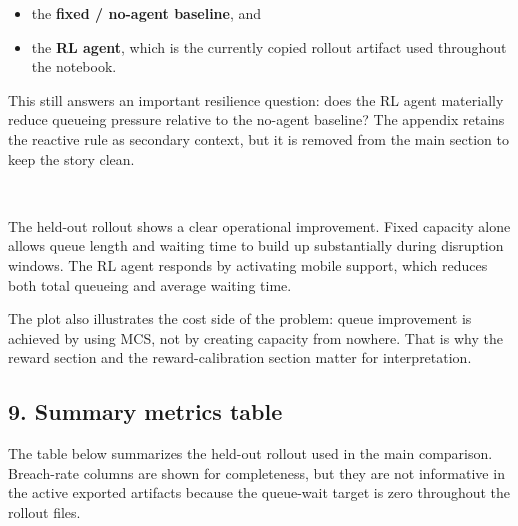 \documentclass[11pt]{article}
\providecommand{\tightlist}{%
      \setlength{\itemsep}{0pt}\setlength{\parskip}{0pt}}
\begin{document}
\begin{itemize}
\tightlist
\item
  the \textbf{fixed / no-agent baseline}, and
\item
  the \textbf{RL agent}, which is the currently copied rollout artifact
  used throughout the notebook.
\end{itemize}

This still answers an important resilience question: does the RL agent
materially reduce queueing pressure relative to the no-agent baseline?
The appendix retains the reactive rule as secondary context, but it is
removed from the main section to keep the story clean.

    \begin{center}
    \end{center}
    { \hspace*{\fill} \\}
    
    The held-out rollout shows a clear operational improvement. Fixed
capacity alone allows queue length and waiting time to build up
substantially during disruption windows. The RL agent responds by
activating mobile support, which reduces both total queueing and average
waiting time.

The plot also illustrates the cost side of the problem: queue
improvement is achieved by using MCS, not by creating capacity from
nowhere. That is why the reward section and the reward-calibration
section matter for interpretation.

    \subsection{9. Summary metrics table}\label{summary-metrics-table}

The table below summarizes the held-out rollout used in the main
comparison. Breach-rate columns are shown for completeness, but they are
not informative in the active exported artifacts because the queue-wait
target is zero throughout the rollout files.
\end{document}
